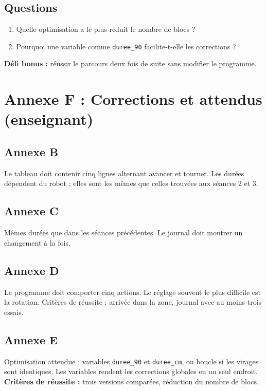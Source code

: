 \documentclass[11pt,a4paper]{article}
\begin{document}
\subsection*{Questions}
\begin{enumerate}
 \item Quelle optimisation a le plus réduit le nombre de blocs ? \dotfill
 \item Pourquoi une variable comme \texttt{duree\_90} facilite-t-elle les corrections ? \dotfill
\end{enumerate}

\textbf{Défi bonus :} réussir le parcours deux fois de suite sans modifier le programme.

\newpage
\section*{Annexe F : Corrections et attendus (enseignant)}

\subsection*{Annexe B}
Le tableau doit contenir cinq lignes alternant avancer et tourner. Les durées dépendent du robot ; elles sont les mêmes que celles trouvées aux séances 2 et 3.

\subsection*{Annexe C}
Mêmes durées que dans les séances précédentes. Le journal doit montrer un changement à la fois.

\subsection*{Annexe D}
Le programme doit comporter cinq actions. Le réglage souvent le plus difficile est la rotation. Critères de réussite : arrivée dans la zone, journal avec au moins trois essais.

\subsection*{Annexe E}
Optimisation attendue : variables \texttt{duree\_90} et \texttt{duree\_cm}, ou boucle si les virages sont identiques. Les variables rendent les corrections globales en un seul endroit.\\
\textbf{Critères de réussite :} trois versions comparées, réduction du nombre de blocs.
\end{document}
